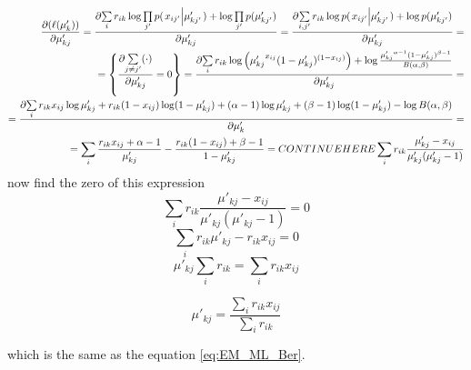\documentclass[a4paper,twoside=false,abstract=false,numbers=noenddot,
titlepage=false,headings=small,parskip=half,version=last]{scrartcl}
\begin{document}
\begin{solution}
    \begin{eqnarray}
        \label{eq:MAP_general}
        \frac{\partial{
            \left(
            \ell(\mu'_k)
            \right)
        }}{\partial{
            \mu'_{kj}
        }} = 
        \frac{\partial{
            \sum\limits_i r_{ik}\log \prod\limits_{j'} p{(\left. x_{ij'} \middle\vert \mu'_{kj'} \right.)}
            + \log\prod\limits_{j'} p{(\mu'_{kj'})}
        }}{\partial{
            \mu'_{kj} 
        }}=
        \frac{\partial{
            \sum\limits_{i,j'} r_{ik}\log p{(\left. x_{ij'} \middle\vert \mu'_{kj'} \right.)}
            + \log p{(\mu'_{kj'})}
        }}{\partial{
            \mu'_{kj}
        }}=\\=
        \left\{
            \frac{\partial{
                \sum\limits_{j\neq j'} (\cdot)
            }}{\partial{
                \mu'_{kj}
            }} = 0
        \right\} = 
        \frac{\partial{
            \sum\limits_{i}r_{ik}\log \left(
                {\mu'_{kj}}^{x_{ij}}
                (1-{\mu'_{kj}})^{(1-x_{ij})}
            \right)
            + \log \frac{
                    {\mu'_{kj}}^{\alpha-1} (1-\mu'_{kj})^{\beta-1}
                }{
                    B(\alpha,\beta)
                }
        }}{\partial{
            \mu'_{kj}
        }}
        = \\ =
        \frac{\partial{
            \sum\limits_{i}r_{ik} x_{ij}\log{\mu'_{kj}} +
            r_{ik}(1-x_{ij})\log({1-\mu'_{kj}})+
            (\alpha-1)\log\mu'_{kj}+(\beta-1)\log(1-\mu'_{kj})-\log B(\alpha,\beta)
        }}{\partial{
            \mu'_k  
        }}  
        = \\ = 
        \sum\limits_{i} \frac{r_{ik}x_{ij}+\alpha-1}{\mu'_{kj}} -
        \frac{r_{ik}(1-x_{ij})+\beta-1}{1-\mu'_{kj}} 
        = CONTINUE HERE 
        \sum\limits_i r_{ik}\frac{
            \mu'_{kj} - x_{ij}
        }
        {
            \mu'_{kj}(\mu'_{kj}-1)    
        }
    \end{eqnarray}
    now find the zero of this expression
    \begin{equation}
         \sum\limits_i r_{ik}\frac{
            \mu'_{kj} - x_{ij}
        }
        {
            \mu'_{kj}(\mu'_{kj}-1)    
        } = 0
    \end{equation}
    \begin{equation}
         \sum\limits_i
            r_{ik}\mu'_{kj} - r_{ik}x_{ij}
         = 0
    \end{equation}
    \begin{equation}
        \mu'_{kj}\sum\limits_i r_{ik} = \sum\limits_i r_{ik} x_{ij} 
    \end{equation}

    \begin{equation}
        \mu'_{kj} = \frac{
            \sum_i r_{ik}x_{ij}
        }
        {
            \sum_i r_{ik}
        }
    \end{equation}

    which is the same as the equation \eqref{eq:EM_ML_Ber}.
    

\end{solution}

\end{document}
